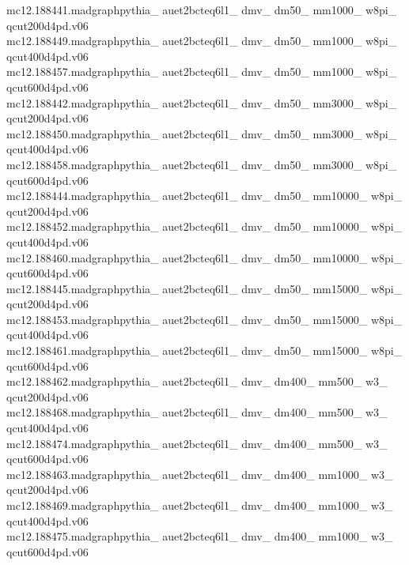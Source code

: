 mc12.188441.madgraphpythia\_ auet2bcteq6l1\_ dmv\_ dm50\_ mm1000\_ w8pi\_ qcut200d4pd.v06\\
mc12.188449.madgraphpythia\_ auet2bcteq6l1\_ dmv\_ dm50\_ mm1000\_ w8pi\_ qcut400d4pd.v06\\
mc12.188457.madgraphpythia\_ auet2bcteq6l1\_ dmv\_ dm50\_ mm1000\_ w8pi\_ qcut600d4pd.v06\\

mc12.188442.madgraphpythia\_ auet2bcteq6l1\_ dmv\_ dm50\_ mm3000\_ w8pi\_ qcut200d4pd.v06\\
mc12.188450.madgraphpythia\_ auet2bcteq6l1\_ dmv\_ dm50\_ mm3000\_ w8pi\_ qcut400d4pd.v06\\
mc12.188458.madgraphpythia\_ auet2bcteq6l1\_ dmv\_ dm50\_ mm3000\_ w8pi\_ qcut600d4pd.v06\\

mc12.188444.madgraphpythia\_ auet2bcteq6l1\_ dmv\_ dm50\_ mm10000\_ w8pi\_ qcut200d4pd.v06\\
mc12.188452.madgraphpythia\_ auet2bcteq6l1\_ dmv\_ dm50\_ mm10000\_ w8pi\_ qcut400d4pd.v06\\
mc12.188460.madgraphpythia\_ auet2bcteq6l1\_ dmv\_ dm50\_ mm10000\_ w8pi\_ qcut600d4pd.v06\\

mc12.188445.madgraphpythia\_ auet2bcteq6l1\_ dmv\_ dm50\_ mm15000\_ w8pi\_ qcut200d4pd.v06\\
mc12.188453.madgraphpythia\_ auet2bcteq6l1\_ dmv\_ dm50\_ mm15000\_ w8pi\_ qcut400d4pd.v06\\
mc12.188461.madgraphpythia\_ auet2bcteq6l1\_ dmv\_ dm50\_ mm15000\_ w8pi\_ qcut600d4pd.v06\\

mc12.188462.madgraphpythia\_ auet2bcteq6l1\_ dmv\_ dm400\_ mm500\_ w3\_ qcut200d4pd.v06\\
mc12.188468.madgraphpythia\_ auet2bcteq6l1\_ dmv\_ dm400\_ mm500\_ w3\_ qcut400d4pd.v06\\
mc12.188474.madgraphpythia\_ auet2bcteq6l1\_ dmv\_ dm400\_ mm500\_ w3\_ qcut600d4pd.v06\\

mc12.188463.madgraphpythia\_ auet2bcteq6l1\_ dmv\_ dm400\_ mm1000\_ w3\_ qcut200d4pd.v06\\
mc12.188469.madgraphpythia\_ auet2bcteq6l1\_ dmv\_ dm400\_ mm1000\_ w3\_ qcut400d4pd.v06\\
mc12.188475.madgraphpythia\_ auet2bcteq6l1\_ dmv\_ dm400\_ mm1000\_ w3\_ qcut600d4pd.v06\\

